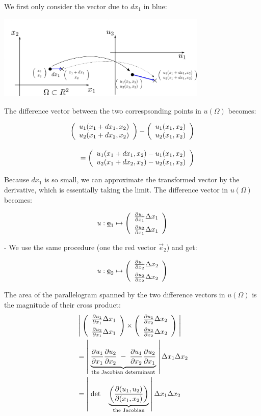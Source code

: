 \newpage

We first only consider the vector due to $dx_1$ in blue:

\includegraphics[width=0.75\textwidth]{img/x1.pdf}

The difference vector between the two correspsonding points in $u(\Omega)$ becomes:

\begin{equation*}
\begin{array}{r}
\left( \begin{array}{rrrrrrrrrrrrrrrrrrrrrrrrrr} 
u_1 (x_1 + dx_1, x_2)\\
u_2 (x_1 + dx_2, x_2)
\\ \end{array} \right) - 
\left( \begin{array}{rrrrrrrrrrrrrrrrrrrrrrrrrr} 
u_1 (x_1, x_2)\\
u_2 (x_1, x_2)
\\ \end{array} \right) \\[0.7cm]
=
\left( \begin{array}{rrrrrrrrrrrrrrrrrrrrrrrrrr} 
u_1 (x_1 + dx_1, x_2) - u_1 (x_1, x_2)\\
u_2 (x_1 + dx_2, x_2) - u_2 (x_1, x_2)
\\ \end{array} \right)
\end{array}
\end{equation*}

Because $dx_1$ is so small, we can approximate the transformed vector by the derivative, 
which is essentially taking the limit. The difference vector in $u(\Omega)$ becomes:

$$
u: \underline{\mathbf{e}}_1 \mapsto 
\left( \begin{array}{rrrrrrrrrrrrrrrrrrrrrrrrrr} 
\frac{\partial u_1}{\partial x_1} \Delta x_1\\[0.2cm]
\frac{\partial u_2}{\partial x_1} \Delta x_1
\\ \end{array} \right)
$$


- We use the same procedure (one the red vector $\vec e_2$) and get:

$$
u: \underline{\mathbf{e}}_2 \mapsto 
\left( \begin{array}{rrrrrrrrrrrrrrrrrrrrrrrrrr} 
\frac{\partial u_1}{\partial x_2} \Delta x_2\\[0.2cm]
\frac{\partial u_2}{\partial x_2} \Delta x_2
\\ \end{array} \right)
$$

The area of the parallelogram spanned by the two difference vectors in $u(\Omega)$ 
is the magnitude of their cross product:
\begin{align*}
&\left| \; 
\left( \begin{array}{rrrrrrrrrrrrrrrrrrrrrrrrrr} 
\frac{\partial u_1}{\partial x_1} \Delta x_1\\[0.2cm]
\frac{\partial u_2}{\partial x_1} \Delta x_1
\\ \end{array} \right)
\times
\left( \begin{array}{rrrrrrrrrrrrrrrrrrrrrrrrrr} 
\frac{\partial u_1}{\partial x_2} \Delta x_2\\[0.2cm]
\frac{\partial u_2}{\partial x_2} \Delta x_2
\\ \end{array} \right)
\; \right|\\ 
&=
\left| \; 
\underbrace{
\frac{\partial u_1}{\partial x_1} \frac{\partial u_2}{\partial x_2}
\; - \;
\frac{\partial u_1}{\partial x_2} \frac{\partial u_2}{\partial x_1}
}_{\text{the Jacobian determinant}}
\; \right| \Delta x_1 \Delta x_2 \\
&= 
\left| \; \det \quad
\underbrace{
\left(
\frac{\partial (u_1, u_2)}{\partial (x_1,x_2)}
\right)
}_{\text{the Jacobian}}
\; \right| \Delta x_1 \Delta x_2
\end{align*}

